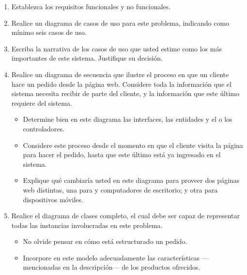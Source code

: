 \documentclass[11pt,letterpaper]{article}
\begin{document}
\begin{spacing}{1.2}
\begin{Problem}
    \begin{enumerate}
        \item Establezca los requisitos funcionales y no funcionales.
        \item Realice un diagrama de casos de uso para este problema, indicando como mínimo seis
            casos de uso.
        \item Escriba la narrativa de los  casos de uso que usted estime como los más
            importantes de este sistema. Justifique su decisión.
        \item Realice un diagrama de secuencia que ilustre el proceso en que un cliente
            hace un pedido desde la página web. Considere toda la información que el sistema necesita
            recibir de parte del cliente, y la información que este último requiere del sistema.
        \begin{itemize}
            \item Determine bien en este diagrama las interfaces, las entidades y el o los controladores.
            \item Considere este proceso desde el momento en que el cliente visita la página para hacer
                el pedido, hasta que este último está ya ingresado en el sistema.
            \item Explique qué cambiaría usted en este diagrama para proveer dos páginas web distintas,
                una para  y computadores de escritorio; y otra para dispositivos móviles.
        \end{itemize}
        \item Realice el diagrama de clases completo, el cual debe ser capaz de representar todas
            las instancias involucradas en este problema.
        \begin{itemize}
            \item No olvide pensar en cómo está estructurado un pedido.
            \item Incorpore en este modelo adecuadamente las características ---mencionadas en la descripción--- de los productos ofrecidos.
        \end{itemize}
    \end{enumerate}

\end{Problem}

\end{spacing}
\end{document}
